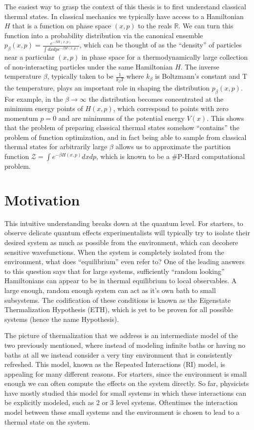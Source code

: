 The easiest way to grasp the context of this thesis is to first understand classical thermal states. In classical mechanics we typically have access to a Hamiltonian $H$ that is a function on phase space $(x, p)$ to the reals $\mathbb{R}$. We can turn this function into a probability distribution via the canonical ensemble $p_\beta (x, p) = \frac{e^{- \beta H(x, p)}}{\int dx dp e^{-\beta H(x, p)}}$, which can be thought of as the ``density'' of particles near a particular $(x,p)$ in phase space for a thermodynamically large collection of non-interacting particles under the same Hamiltonian $H$. The inverse temperature $\beta$, typically taken to be $\frac{1}{k_\beta T}$ where $k_\beta$ is Boltzmann's constant and T the temperature, plays an important role in shaping the distribution $p_\beta(x,p)$. For example, in the $\beta \to \infty$ the distribution becomes concentrated at the minimum energy points of $H(x, p)$, which correspond to points with zero momentum $p=0$ and are minimums of the potential energy $V(x)$. This shows that the problem of preparing classical thermal states somehow ``contains'' the problem of function optimization, and in fact being able to sample from classical thermal states for arbitrarily large $\beta$ allows us to approximate the partition function $\mathcal{Z} = \int e^{-\beta H(x,p)} dx dp$, which is known to be a \#P-Hard computational problem.



\section{Motivation}

This intuitive understanding breaks down at the quantum level. For starters, to observe delicate quantum effects experimentalists will typically try to isolate their desired system as much as possible from the environment, which can decohere sensitive wavefunctions. When the system is completely isolated from the environment, what does ``equilibrium'' even refer to? One of the leading answers to this question says that for large systems, sufficiently ``random looking'' Hamiltonians can appear to be in thermal equilibrium to local observables. A large enough, random enough system can act as it's own bath to small subsystems. The codification of these conditions is known as the Eigenstate Thermalization Hypothesis (ETH), which is yet to be proven for all possible systems (hence the name Hypothesis).

The picture of thermalization that we address is an intermediate model of the two previously mentioned, where instead of modeling infinite baths or having no baths at all we instead consider a very tiny environment that is consistently refreshed. This model, known as the Repeated Interactions (RI) model, is appealing for many different reasons. For starters, since the environment is small enough we can often compute the effects on the system directly. So far, physicists have mostly studied this model for small systems in which these interactions can be explicitly modeled, such as 2 or 3 level systems. Oftentimes the interaction model between these small systems and the environment is chosen to lead to a thermal state on the system.

